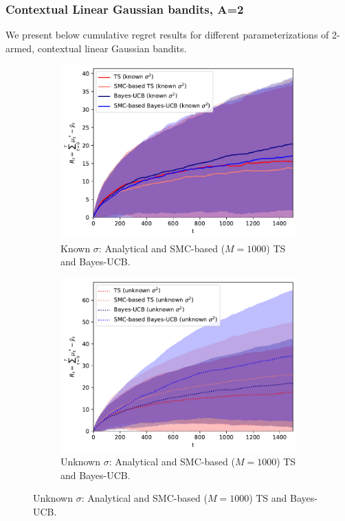 
\subsubsection{Contextual Linear Gaussian bandits, A=2}
\label{asssec:static_bandits_linearGaussian_2}

We present below cumulative regret results for different parameterizations of 2-armed, contextual linear Gaussian bandits.

\begin{figure}[!h]
	\centering
	\begin{subfigure}[b]{0.46\textwidth}
		\centering
		\includegraphics[width=\textwidth]{./fods_figs/static/linear_gaussian/A2/theta-0.1_-0.1_0.1_0.1_sigma0.5_0.5_M1000_cumulative_regret_knownsigma}
		\caption{Known $\sigma$: Analytical and SMC-based ($M=1000$) TS and Bayes-UCB.}
	\end{subfigure}
	\begin{subfigure}[b]{0.46\textwidth}
		\centering
		\includegraphics[width=\textwidth]{./fods_figs/static/linear_gaussian/A2/theta-0.1_-0.1_0.1_0.1_sigma0.5_0.5_M1000_cumulative_regret_unknownsigma}
		\caption{Unknown $\sigma$: Analytical and SMC-based ($M=1000$) TS and Bayes-UCB.}
	\end{subfigure}
	

\end{figure}
